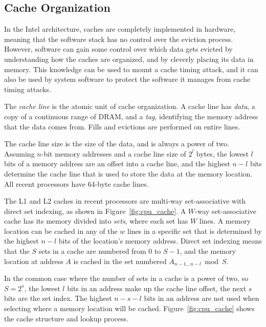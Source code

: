 \subsection{Cache Organization}
\label{sec:cache_org}

In the Intel architecture, caches are completely implemented in hardware,
meaning that the software stack has no control over the eviction process.
However, software can gain some control over which data gets evicted by
understanding how the caches are organized, and by cleverly placing its data in
memory. This knowledge can be used to mount a cache timing attack, and it can
also be used by system software to protect the software it manages from cache
timing attacks.

The \textit{cache line} is the atomic unit of cache organization. A cache line
has \textit{data}, a copy of a continuous range of DRAM, and a \textit{tag},
identifying the memory address that the data comes from. Fills and evictions
are performed on entire lines.

The cache line size is the size of the data, and is always a power of two.
Assuming $n$-bit memory addresses and a cache line size of $2^{l}$ bytes, the
lowest $l$ bits of a memory address are an offset into a cache line, and the
highest $n - l$ bits determine the cache line that is used to store the data at
the memory location. All recent processors have 64-byte cache lines.

The L1 and L2 caches in recent processors are multi-way set-associative with
direct set indexing, as shown in Figure~\ref{fig:cpu_cache}. A $W$-way
set-associative cache has its memory divided into \textit{sets}, where each set
has $W$ lines. A memory location can be cached in any of the $w$ lines in a
specific set that is determined by the highest $n - l$ bits of the location's
memory address. Direct set indexing means that the $S$ sets in a cache are
numbered from $0$ to $S - 1$, and the memory location at address $A$ is cached
in the set numbered $A_{n - 1 \ldots n - l} \bmod S$.

In the common case where the number of sets in a cache is a power of two, so $S
= 2^{s}$, the lowest $l$ bits in an address make up the cache line offset, the
next $s$ bits are the set index. The highest $n - s - l$ bits in an address are
not used when selecting where a memory location will be cached.
Figure~\ref{fig:cpu_cache} shows the cache structure and lookup process.

